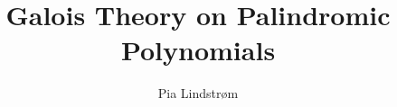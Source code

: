 \documentclass[a4paper, oneside, UKenglish]{memoir}
\author{Pia Lindstr{\o}m}
\title{Galois Theory on Palindromic Polynomials}
\begin{document}
    \masterfrontpage
\end{document}
